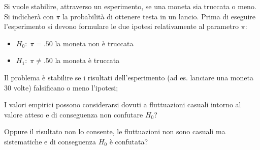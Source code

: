 \documentclass[
  ignorenonframetext,
  compress, aspectratio=149]{beamer}
\providecommand{\tightlist}{%
  \setlength{\itemsep}{0pt}\setlength{\parskip}{0pt}}
\begin{document}
\begin{frame}{}
\label{section-15}
\begin{tcolorbox}[enhanced jigsaw, opacityback=0, bottomtitle=1mm, bottomrule=.15mm, titlerule=0mm, coltitle=black, toprule=.15mm, breakable, toptitle=1mm, colbacktitle=quarto-callout-note-color!10!white, arc=.35mm, title={Esempio}, rightrule=.15mm, leftrule=.75mm, opacitybacktitle=0.6, left=2mm, colframe=quarto-callout-note-color-frame, colback=white]

Si vuole stabilire, attraverso un esperimento, se una moneta sia
truccata o meno. Si indicherà con \(\pi\) la probabilità di ottenere
testa in un lancio. Prima di eseguire l'esperimento si devono formulare
le due ipotesi relativamente al parametro \(\pi\):

\vspace{3mm}

\begin{itemize}
\tightlist
\item
  \(H_0: \; \pi = .50\) la moneta non è truccata
\end{itemize}

\vspace{3mm}

\begin{itemize}
\tightlist
\item
  \(H_1: \; \pi \neq .50\) la moneta è truccata
\end{itemize}

\end{tcolorbox}
\end{frame}

\begin{frame}{}
\label{section-16}
Il problema è stabilire se i risultati dell'esperimento (ad es. lanciare
una moneta 30 volte) falsificano o meno l'ipotesi;

\vspace{3mm}

I valori empirici possono considerarsi dovuti a fluttuazioni casuali
intorno al valore atteso e di conseguenza non confutare \(H_0\)?

\vspace{3mm}

Oppure il risultato non lo consente, le fluttuazioni non sono casuali ma
sistematiche e di conseguenza \(H_0\) è confutata?
\end{frame}
\end{document}
